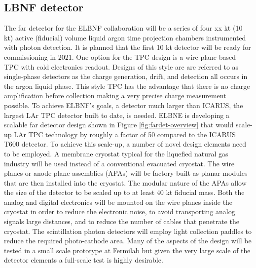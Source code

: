\subsection{LBNF detector}

The far detector for the ELBNF collaboration will be a series of four xx kt (10 kt) active (fiducial) volume  liquid argon time projection chambers instrumented with photon detection. It is planned that the first 10 kt detector will be ready for commissioning in 2021. One option for the TPC design is a wire plane based TPC with cold electronics readout. Designs of this style are are referred to as single-phase detectors as the charge generation, drift, and detection all occurs in the argon liquid phase. This style TPC has the advantage that there is no charge amplification before collection making a very precise charge measurement possible. To achieve ELBNF's goals, a detector much larger than ICARUS, the largest LAr TPC detector built to date, is needed. ELBNE is developing a scalable far detector design shown in Figure \ref{fig:fardet-overview} that would scale-up LAr TPC technology by roughly a factor of 50 compared to the ICARUS T600 detector. To achieve this scale-up, a number of novel design elements need to be employed. A membrane cryostat typical for the liquefied natural gas industry will be used instead of a conventional evacuated cryostat. The wire planes or anode plane assemblies (APAs) will be factory-built as planar modules that are then installed into the cryostat. The modular nature of the APAs allow the size of the detector to be scaled up to at least 40 kt fiducial mass. Both the analog and digital electronics will be mounted on the wire planes inside the cryostat in order to reduce the electronic noise, to avoid transporting analog signals large distances, and to reduce the number of cables that penetrate the cryostat. The scintillation photon detectors will employ light collection paddles to reduce the required photo-cathode area. Many of the aspects of the design will be tested in a small scale prototype at Fermilab but given the very large scale of the detector elements a full-scale test is highly desirable.



